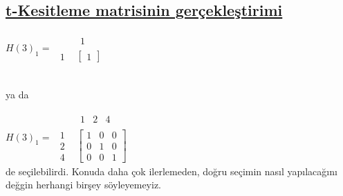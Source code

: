\documentclass{amsbook}
\begin{document}
    \subsection{\underline{t-Kesitleme matrisinin gerçekleştirimi \hspace{3.4 in}}\\}

    \hspace{2cm}$ H(3)_{1} =
    \begin{array}{cc}
        & \begin{array}{c}
            1
        \end{array} \\
        \begin{array}{c}
            1
        \end{array} &
        \left[ \begin{array}{cc}
            1
        \end{array} \right]
    \end{array}$
    
    \\ ya da
    
   \hspace{2cm}$ H(3)_{1} =
    \begin{array}{ccc}
        & \begin{array}{ccc}
            1& 2& 4 
        \end{array} \\
        \begin{array}{c}
            1 \\ 2 \\ 4
        \end{array} &
        \left[ \begin{array}{ccc}
            1 & 0 &  0 \\
            0 & 1 &  0 \\
            0 & 0 &  1 
        \end{array} \right]
    \end{array}$
\\

de seçilebilirdi. Konuda daha çok ilerlemeden, doğru seçimin nasıl yapılacağını değgin herhangi birşey söyleyemeyiz.

\end{document}
